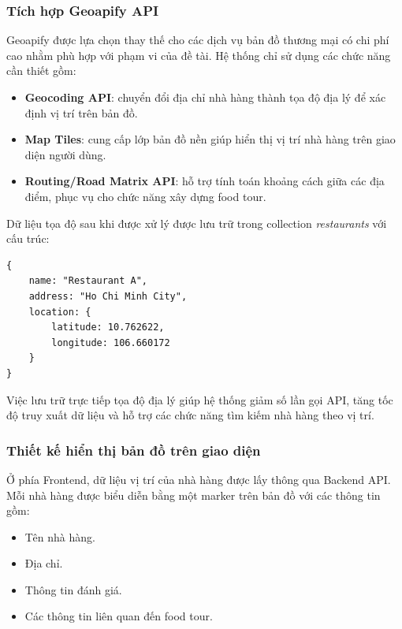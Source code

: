 \subsubsection{Tích hợp Geoapify API}

Geoapify được lựa chọn thay thế cho các dịch vụ bản đồ thương mại có chi
phí cao nhằm phù hợp với phạm vi của đề tài. Hệ thống chỉ sử dụng các
chức năng cần thiết gồm:

\begin{itemize}
    \item \textbf{Geocoding API}: chuyển đổi địa chỉ nhà hàng thành tọa độ
    địa lý để xác định vị trí trên bản đồ.
    
    \item \textbf{Map Tiles}: cung cấp lớp bản đồ nền giúp hiển thị vị trí
    nhà hàng trên giao diện người dùng.
    
    \item \textbf{Routing/Road Matrix API}: hỗ trợ tính toán khoảng cách
    giữa các địa điểm, phục vụ cho chức năng xây dựng food tour.
\end{itemize}


Dữ liệu tọa độ sau khi được xử lý được lưu trữ trong collection
\textit{restaurants} với cấu trúc:

\begin{verbatim}
{
    name: "Restaurant A",
    address: "Ho Chi Minh City",
    location: {
        latitude: 10.762622,
        longitude: 106.660172
    }
}
\end{verbatim}


Việc lưu trữ trực tiếp tọa độ địa lý giúp hệ thống giảm số lần gọi API,
tăng tốc độ truy xuất dữ liệu và hỗ trợ các chức năng tìm kiếm nhà hàng
theo vị trí.


\subsubsection{Thiết kế hiển thị bản đồ trên giao diện}

Ở phía Frontend, dữ liệu vị trí của nhà hàng được lấy thông qua Backend
API. Mỗi nhà hàng được biểu diễn bằng một marker trên bản đồ với các
thông tin gồm:

\begin{itemize}
    \item Tên nhà hàng.
    \item Địa chỉ.
    \item Thông tin đánh giá.
    \item Các thông tin liên quan đến food tour.
\end{itemize}

